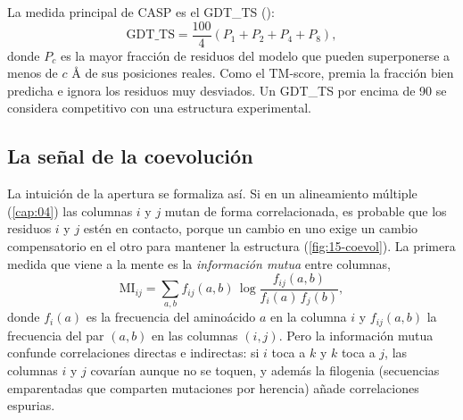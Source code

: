 La medida principal de CASP es el GDT\_TS ():
\begin{equation}\label{eq:15-gdt}
\mathrm{GDT\_TS}=\frac{100}{4}\left(P_1+P_2+P_4+P_8\right),
\end{equation}
donde $P_c$ es la mayor fracción de residuos del modelo que pueden superponerse a menos de $c$ \si{\angstrom} de sus posiciones reales. Como el TM-score, premia la fracción bien predicha e ignora los residuos muy desviados. Un GDT\_TS por encima de 90 se considera competitivo con una estructura experimental.

\begin{simbolos}
\end{simbolos}

\subsection{La señal de la coevolución}

La intuición de la apertura se formaliza así. Si en un alineamiento múltiple (\cref{cap:04}) las columnas $i$ y $j$ mutan de forma correlacionada, es probable que los residuos $i$ y $j$ estén en contacto, porque un cambio en uno exige un cambio compensatorio en el otro para mantener la estructura (\cref{fig:15-coevol}). La primera medida que viene a la mente es la \emph{información mutua} entre columnas,
\begin{equation}\label{eq:15-mi}
\mathrm{MI}_{ij}=\sum_{a,b} f_{ij}(a,b)\,\log\frac{f_{ij}(a,b)}{f_i(a)\,f_j(b)},
\end{equation}
donde $f_i(a)$ es la frecuencia del aminoácido $a$ en la columna $i$ y $f_{ij}(a,b)$ la frecuencia del par $(a,b)$ en las columnas $(i,j)$. Pero la información mutua confunde correlaciones directas e indirectas: si $i$ toca a $k$ y $k$ toca a $j$, las columnas $i$ y $j$ covarían aunque no se toquen, y además la filogenia (secuencias emparentadas que comparten mutaciones por herencia) añade correlaciones espurias.

\begin{simbolos}
\end{simbolos}

